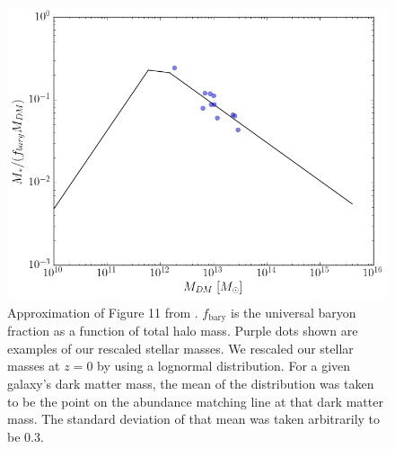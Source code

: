 \documentclass[fleqn,usenatbib,useAMS]{mnras}
\begin{document}
\begin{figure}
\includegraphics[width=1.0\columnwidth]{plots/stellar_to_halo_ratio.png}
\caption{Approximation of Figure 11 from \citet{2018AstL...44....8K}.  $f_\mathrm{bary}$ is the universal baryon fraction as a function of total halo mass.  Purple dots shown are examples of our rescaled stellar masses.  We rescaled our stellar masses at $z=0$ by using a lognormal distribution.  For a given galaxy's dark matter mass, the mean of the distribution was taken to be the point on the abundance matching line at that dark matter mass.  The standard deviation of that mean was taken arbitrarily to be 0.3.}
\label{fig:stellar1}
\end{figure}
\end{document}

